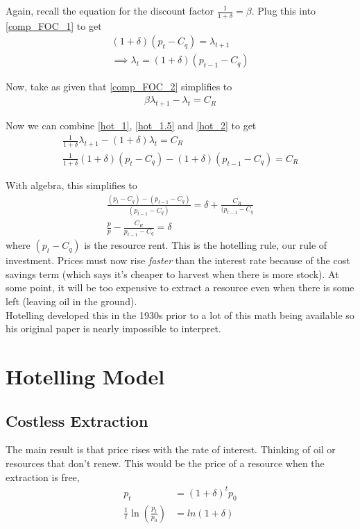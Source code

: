 \documentclass[12pt]{article}
\begin{document}
Again, recall the equation for the discount factor $\frac{1}{1+\delta} = \beta$. Plug this into \ref{comp_FOC_1} to get 
\begin{align}
    (1+\delta) (p_t - C_q) = \lambda_{t+1} \label{hot_1.5}\\
    \implies \lambda_t = (1+\delta)(p_{t-1} - C_q) \label{hot_1}
\end{align}

Now, take as given that \ref{comp_FOC_2} simplifies to 
\begin{align}
    \beta \lambda_{t+1} - \lambda_t = C_R \label{hot_2}
\end{align}

Now we can combine \ref{hot_1}, \ref{hot_1.5} and \ref{hot_2} to get
\begin{align}
    \frac{1}{1+\delta}\lambda_{t+1} - (1+ \delta)\lambda_t = C_R \\
    \frac{1}{1+\delta}(1+\delta)(p_t-C_q) - (1+ \delta)(p_{t-1} - C_q) = C_R
\end{align}

With algebra, this simplifies to 
\begin{align}
    \frac{(p_t - C_q) - (p_{t-1} - C_q)}{(p_{t-1} - C_q)} = \delta + \frac{C_R}{(p_{t-1} - C_q}\\
    \frac{\dot p}{p} - \frac{C_R}{p_{t-1} - C_q} = \delta
\end{align}
where $(p_t - C_q)$ is the resource rent. This is the hotelling rule, our rule of investment. Prices must now rise \textit{faster} than the interest rate because of the cost savings term (which says it's cheaper to harvest when there is more stock). At some point, it will be too expensive to extract a resource even when there is some left (leaving oil in the ground).\\

Hotelling developed this in the 1930s prior to a lot of this math being available so his original paper is nearly impossible to interpret. 

\section{Hotelling Model}

\subsection{Costless Extraction}

The main result  is that price rises with the rate of interest. Thinking of oil or resources that don't renew. This would be the price of a resource when the extraction is free,
\begin{align}
    p_t &= (1 + \delta) ^t p_0\\
    \frac{1}{t} \ln(\frac{p_t}{p_0}) &= ln(1 +\delta)
\end{align}
\end{document}
